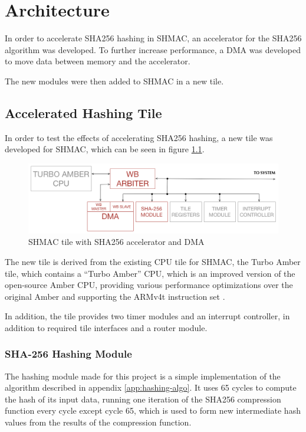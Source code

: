 \chapter{Architecture}
\label{cha:architecture}

In order to accelerate SHA256 hashing in SHMAC, an accelerator for the SHA256 algorithm
was developed. To further increase performance, a DMA was developed to move data between
memory and the accelerator.

The new modules were then added to SHMAC in a new tile.

\section{Accelerated Hashing Tile}
\label{sec:aht}

In order to test the effects of accelerating SHA256 hashing, a new tile was developed for
SHMAC, which can be seen in figure \ref{fig:SHA-Tile}.

\begin{figure}[htb]
    \centering
    \includegraphics[width=1.0\textwidth]{Figures/Tile/HashingTile}
    \caption{SHMAC tile with SHA256 accelerator and DMA}
    \label{fig:SHA-Tile}
\end{figure}

The new tile is derived from the existing CPU tile for SHMAC, the Turbo Amber tile, which contains
a ``Turbo Amber'' CPU, which is an improved version of the open-source Amber CPU, providing various
performance optimizations over the original Amber and supporting the ARMv4t instruction set \cite{turboamber}.

In addition, the tile provides two timer modules and an interrupt controller, in addition to required
tile interfaces and a router module.

\subsection{SHA-256 Hashing Module}

The hashing module made for this project is a simple implementation of the algorithm described in
appendix \ref{app:hashing-algo}. It uses 65 cycles to compute the hash of its input data, running
one iteration of the SHA256 compression function every cycle except cycle 65, which is used to
form new intermediate hash values from the results of the compression function.

